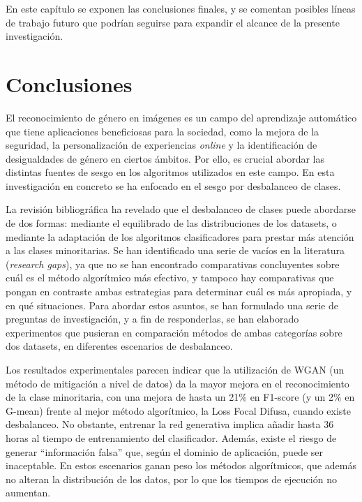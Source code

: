En este capítulo se exponen las conclusiones finales, y se comentan posibles líneas de trabajo futuro que podrían seguirse para expandir el alcance de la presente investigación.

\section{Conclusiones\label{SEC:CONCLUSIONES}}

El reconocimiento de género en imágenes es un campo del aprendizaje automático que tiene aplicaciones beneficiosas para la sociedad, como la mejora de la seguridad, la personalización de experiencias \textit{online} y la identificación de desigualdades de género en ciertos ámbitos. Por ello, es crucial abordar las distintas fuentes de sesgo en los algoritmos utilizados en este campo. En esta investigación en concreto se ha enfocado en el sesgo por desbalanceo de clases.

La revisión bibliográfica \cite{johnson2019survey,aka2021measuring,kim2019multiaccuracy,krishnan2020understanding,li2019learning} ha revelado que el desbalanceo de clases puede abordarse de dos formas: mediante el equilibrado de las distribuciones de los datasets, o mediante la adaptación de los algoritmos clasificadores para prestar más atención a las clases minoritarias. Se han identificado una serie de vacíos en la literatura (\textit{research gaps}), ya que no se han encontrado comparativas concluyentes sobre cuál es el método algorítmico más efectivo, y tampoco hay comparativas que pongan en contraste ambas estrategias para determinar cuál es más apropiada, y en qué situaciones. Para abordar estos asuntos, se han formulado una serie de preguntas de investigación, y a fin de responderlas, se han elaborado experimentos que pusieran en comparación métodos de ambas categorías sobre dos datasets, en diferentes escenarios de desbalanceo.

Los resultados experimentales parecen indicar que la utilización de WGAN (un método de mitigación a nivel de datos) da la mayor mejora en el reconocimiento de la clase minoritaria, con una mejora de hasta un 21\% en F1-score (y un 2\% en G-mean) frente al mejor método algorítmico, la Loss Focal Difusa, cuando existe desbalanceo. No obstante, entrenar la red generativa implica añadir hasta 36 horas al tiempo de entrenamiento del clasificador. Además, existe el riesgo de generar ``información falsa'' que, según el dominio de aplicación, puede ser inaceptable. En estos escenarios ganan peso los métodos algorítmicos, que además no alteran la distribución de los datos, por lo que los tiempos de ejecución no aumentan.

